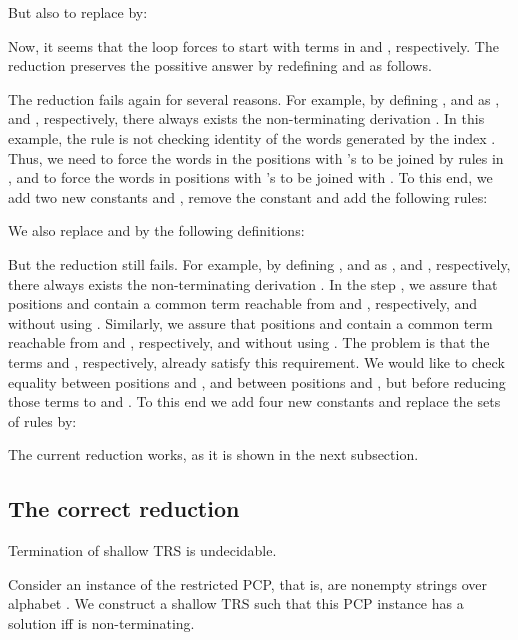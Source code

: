 \documentclass{LMCS}
\theoremstyle{plain}
\begin{document}
{But also to replace  by:



Now, it seems that the loop forces to start with terms
in 
and ,
respectively. The reduction preserves the possitive answer
by redefining  and  as follows.

The reduction fails again for several reasons. For example,
by defining ,  and  as
, 
and ,
respectively, there always exists the non-terminating derivation
.
In this example, the rule  is not checking identity of the words generated
by the index . Thus, we need to force the words
in the positions with 's to be joined by rules in ,
and to force the words in positions with 's to be joined with
. To this end, we add two new constants  and ,
remove the constant  and add the following rules:



We also replace  and  by the following definitions:



But the reduction still fails. For example,
by defining ,  and  as
, 
and ,
respectively, there always exists the non-terminating derivation
.
In the step , we assure that positions  and 
contain a common term reachable from  and , respectively,
and without using . Similarly, we assure that
positions  and 
contain a common term reachable from  and , respectively,
and without using . The problem is that the terms  and ,
respectively, already satisfy this requirement. We would like to check
equality between positions  and , and between positions  and
, but before reducing those terms to  and . To this end
we add four new constants  and replace 
the sets of rules  by:



The current reduction works, as it is shown in the next subsection.


\subsection{The correct reduction}\label{subsection-correct}

\endignore}

\begin{thm}\label{theorem-shallow-undec}
Termination of shallow TRS is undecidable.
\end{thm}
\proof
Consider an instance 
 of the
restricted PCP, that is,
 are nonempty strings over alphabet .
We construct a shallow TRS  such that
this PCP instance  has a solution iff  is non-terminating.
\end{document}

